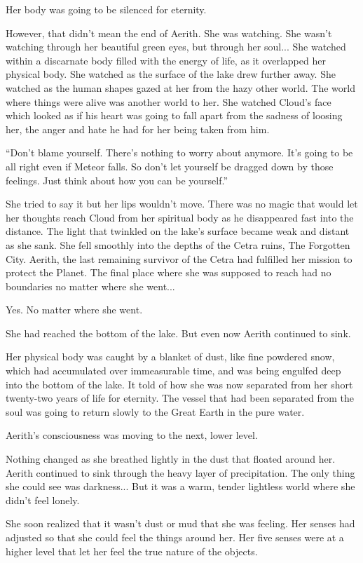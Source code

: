 \documentclass[oneside]{book}
\begin{document}
Her body was going to be silenced for eternity.

However, that didn't mean the end of Aerith. She was watching. She wasn't watching through her beautiful green eyes, but through her soul... She watched within a discarnate body filled with the energy of life, as it overlapped her physical body. She watched as the surface of the lake drew further away. She watched as the human shapes gazed at her from the hazy other world. The world where things were alive was another world to her. She watched Cloud's face which looked as if his heart was going to fall apart from the sadness of loosing her, the anger and hate he had for her being taken from him.

“Don't blame yourself. There's nothing to worry about anymore. It's going to be all right even if Meteor falls. So don't let yourself be dragged down by those feelings. Just think about how you can be yourself.”

She tried to say it but her lips wouldn't move. There was no magic that would let her thoughts reach Cloud from her spiritual body as he disappeared fast into the distance. The light that twinkled on the lake's surface became weak and distant as she sank. She fell smoothly into the depths of the Cetra ruins, The Forgotten City. Aerith, the last remaining survivor of the Cetra had fulfilled her mission to protect the Planet. The final place where she was supposed to reach had no boundaries no matter where she went...

\newpage
Yes. No matter where she went.

She had reached the bottom of the lake. But even now Aerith continued to sink.

Her physical body was caught by a blanket of dust, like fine powdered snow, which had accumulated over immeasurable time, and was being engulfed deep into the bottom of the lake. It told of how she was now separated from her short twenty-two years of life for eternity. The vessel that had been separated from the soul was going to return slowly to the Great Earth in the pure water.

Aerith's consciousness was moving to the next, lower level.

Nothing changed as she breathed lightly in the dust that floated around her. Aerith continued to sink through the heavy layer of precipitation. The only thing she could see was darkness... But it was a warm, tender lightless world where she didn't feel lonely.

She soon realized that it wasn't dust or mud that she was feeling. Her senses had adjusted so that she could feel the things around her. Her five senses were at a higher level that let her feel the true nature of the objects.
\end{document}
